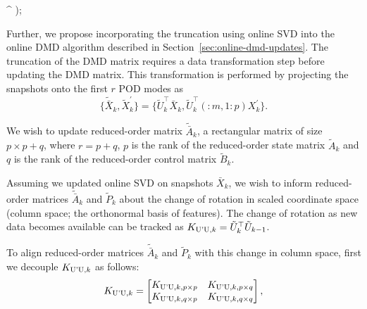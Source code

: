 \begin{algorithm}[H]
\begin{algorithmic}[1]
{\begin{bmatrix}
            \end{bmatrix}^\top
            \right)\);
        }
        \ENDIF{}
    \end{algorithmic}
\end{algorithm}

Further, we propose incorporating the truncation using online SVD into the online DMD algorithm described in Section~\ref{sec:online-dmd-updates}. The truncation of the DMD matrix requires a data transformation step before updating the DMD matrix. This transformation is performed by projecting the snapshots onto the first \(r\) POD modes as
\begin{equation}
    \{\tilde{\bar{X}}_k, \tilde{X}^\prime_k\} = \{\tilde{U}^\top_k\bar{X}_k, \tilde{U}^\top_k(:m, 1:p)X^\prime_k\}.
\end{equation}

We wish to update reduced-order matrix \(\tilde{\bar{A}}_k\), a rectangular matrix of size \(p \times p + q\), where \(r = p + q\), \(p\) is the rank of the reduced-order state matrix \(\tilde{A}_k\) and \(q\) is the rank of the reduced-order control matrix \(\tilde{B}_k\).

Assuming we updated online SVD on snapshots \(\bar{X}_k\), we wish to inform reduced-order matrices \(\tilde{\bar{A}}_k\) and \(\tilde{P}_k\) about the change of rotation in scaled coordinate space (column space; the orthonormal basis of features). The change of rotation as new data becomes available can be tracked as \(K _{\text{U'U}, k} = \tilde{U}_k^\top \tilde{U}_{k-1}\).

To align reduced-order matrices \(\tilde{\bar{A}}_k\) and \(\tilde{P}_k\) with this change in column space, first we decouple \(K _{\text{U'U}, k}\) as follows:
\begin{equation}
    K _{\text{U'U}, k} = \begin{bmatrix}
        K _{\text{U'U}, k, p \times p} & K _{\text{U'U}, k, p \times q} \\
        K _{\text{U'U}, k, q \times p} & K _{\text{U'U}, k, q \times q}
    \end{bmatrix},
\end{equation}

